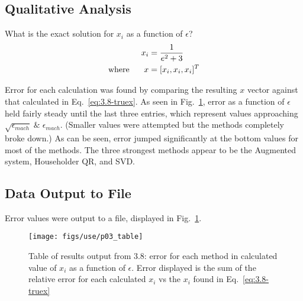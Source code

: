 \documentclass[paper=a4, fontsize=11pt]{scrartcl}
\numberwithin{equation}{section}		%
\numberwithin{figure}{section}			%
\numberwithin{table}{section}				%
\begin{document}
\subsection{Qualitative Analysis}
What is the exact solution for $x_i$ as a function of $\epsilon$?
\begin{align}
	x_i &= \frac{1}{e^2 + 3}  \label{eq:3.8-truex} \\
	\textnormal{where \hspace{5mm}} x &= [x_i, x_i, x_i]^T	
\end{align}
\par Error for each calculation was found by comparing the resulting $x$ vector against that calculated in Eq.~\ref{eq:3.8-truex}. As seen in Fig.~\ref{fig:3.8}, error as a function of $\epsilon$ held fairly steady until the last three entries, which represent values approaching $\sqrt{\epsilon_{mach}} \; \& \; \epsilon_{mach}$. (Smaller values were attempted but the methods completely broke down.) As can be seen, error jumped significantly at the bottom values for most of the methods. The three strongest methods appear to be the Augmented system, Householder QR, and SVD. \\ 

\vspace{4mm}
\subsection{Data Output to File}
Error values were output to a file, displayed in Fig.~\ref{fig:3.8}.
\begin{center}
	\begin{figure}[!h]
		\texttt{[image: figs/use/p03\_table]}
		\caption{Table of results output from 3.8: error for each method in calculated value of $x_i$ as a function of $\epsilon$. Error displayed is the sum of the relative error for each calculated $x_i$ vs the $x_i$ found in Eq.~\ref{eq:3.8-truex} }
		\label{fig:3.8}
	\end{figure}
\end{center}

\vspace{4mm}
\end{document}
